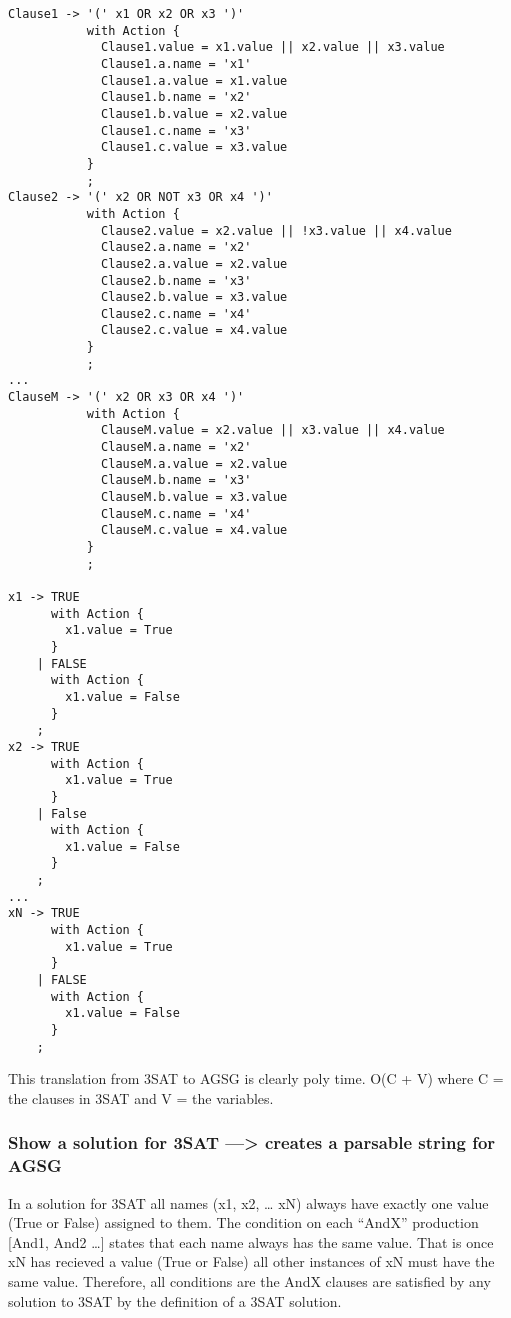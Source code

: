 \begin{verbatim}
Clause1 -> '(' x1 OR x2 OR x3 ')'
           with Action {
             Clause1.value = x1.value || x2.value || x3.value
             Clause1.a.name = 'x1'
             Clause1.a.value = x1.value
             Clause1.b.name = 'x2'
             Clause1.b.value = x2.value
             Clause1.c.name = 'x3'
             Clause1.c.value = x3.value
           }
           ;
Clause2 -> '(' x2 OR NOT x3 OR x4 ')'
           with Action {
             Clause2.value = x2.value || !x3.value || x4.value
             Clause2.a.name = 'x2'
             Clause2.a.value = x2.value
             Clause2.b.name = 'x3'
             Clause2.b.value = x3.value
             Clause2.c.name = 'x4'
             Clause2.c.value = x4.value
           }
           ;
...
ClauseM -> '(' x2 OR x3 OR x4 ')'
           with Action {
             ClauseM.value = x2.value || x3.value || x4.value
             ClauseM.a.name = 'x2'
             ClauseM.a.value = x2.value
             ClauseM.b.name = 'x3'
             ClauseM.b.value = x3.value
             ClauseM.c.name = 'x4'
             ClauseM.c.value = x4.value
           }
           ;

x1 -> TRUE
      with Action {
        x1.value = True
      }
    | FALSE
      with Action {
        x1.value = False
      }
    ;
x2 -> TRUE
      with Action {
        x1.value = True
      }
    | False
      with Action {
        x1.value = False
      }
    ;
...
xN -> TRUE
      with Action {
        x1.value = True
      }
    | FALSE
      with Action {
        x1.value = False
      }
    ;
\end{verbatim}
This translation from 3SAT to AGSG is clearly poly time.
O(\textbar{}C\textbar{} + \textbar{}V\textbar{}) where C = the clauses
in 3SAT and V = the variables.

\subsubsection{Show a solution for 3SAT ---\textgreater{} creates a
parsable string for AGSG}

In a solution for 3SAT all names (x1, x2, \ldots{} xN) always have
exactly one value (True or False) assigned to them. The condition on
each ``AndX'' production {[}And1, And2 \ldots{}{]} states that each name
always has the same value. That is once xN has recieved a value (True or
False) all other instances of xN must have the same value. Therefore,
all conditions are the AndX clauses are satisfied by any solution to
3SAT by the definition of a 3SAT solution.

